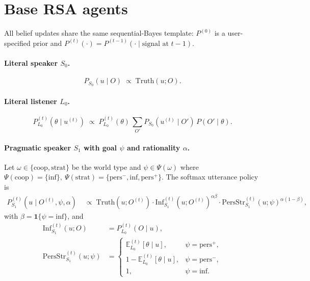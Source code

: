 \documentclass[11pt]{article}
\newcommand{\Obs}{O}                 %
\newcommand{\Utt}{u}                 %
\newcommand{\Truth}{\mathrm{Truth}}
\newcommand{\Inf}{\mathrm{Inf}}
\newcommand{\Pers}{\mathrm{PersStr}}
\newcommand{\SZero}{S_0}
\newcommand{\LZero}{L_0}
\newcommand{\SOne}{S_1}
\newcommand{\Pspk}[2]{P^{(#2)}_{#1}}
\newcommand{\E}{\mathbb{E}}
\newcommand{\ind}{\mathbf{1}}
\newcommand{\Inffn}{\mathrm{inf}}
\begin{document}
\section{Base RSA agents}

All belief updates share the same sequential-Bayes template:
$P^{(0)}$ is a user-specified prior and $P^{(t)}(\cdot) = P^{(t-1)}(\cdot \mid \text{signal at } t-1)$.

\paragraph{Literal speaker $\SZero$.}
\[
    P_{\SZero}(\Utt \mid \Obs) \;\propto\; \Truth(\Utt; \Obs).
\]

\paragraph{Literal listener $\LZero$.}
\[
    \Pspk{\LZero}{t}(\theta \mid \Utt^{(t)})
    \;\propto\; \Pspk{\LZero}{t}(\theta) \,
    \sum_{\Obs'} P_{\SZero}(\Utt^{(t)} \mid \Obs')\, P(\Obs' \mid \theta).
\]

\paragraph{Pragmatic speaker $\SOne$ with goal $\psi$ and rationality $\alpha$.}
Let $\omega \in \{\text{coop},\text{strat}\}$ be the world type and
$\psi \in \Psi(\omega)$ where
\(
    \Psi(\mathrm{coop}) = \{\Inffn\},\
    \Psi(\mathrm{strat}) = \{\text{pers}^{-}, \Inffn, \text{pers}^{+}\}.
\)
The softmax utterance policy is
\begin{align}
    \Pspk{\SOne}{t}(\Utt \mid \Obs^{(t)}, \psi, \alpha)
    &\;\propto\;
    \Truth(\Utt;\Obs^{(t)}) \cdot
    \Inf^{(t)}_{\SOne}(\Utt; \Obs^{(t)})^{\alpha\beta}
    \cdot \Pers^{(t)}_{\SOne}(\Utt; \psi)^{\alpha(1-\beta)},
    \label{eq:s1-policy}
\end{align}
with $\beta = \ind\{\psi = \Inffn\}$, and
\begin{align*}
    \Inf^{(t)}_{\SOne}(\Utt; \Obs) &= \Pspk{\LZero}{t}(\Obs \mid \Utt), \\
    \Pers^{(t)}_{\SOne}(\Utt; \psi) &=
    \begin{cases}
        \E^{(t)}_{\LZero}[\theta \mid \Utt], & \psi = \text{pers}^{+}, \\
        1 - \E^{(t)}_{\LZero}[\theta \mid \Utt], & \psi = \text{pers}^{-}, \\
        1, & \psi = \Inffn.
    \end{cases}
\end{align*}
\end{document}
